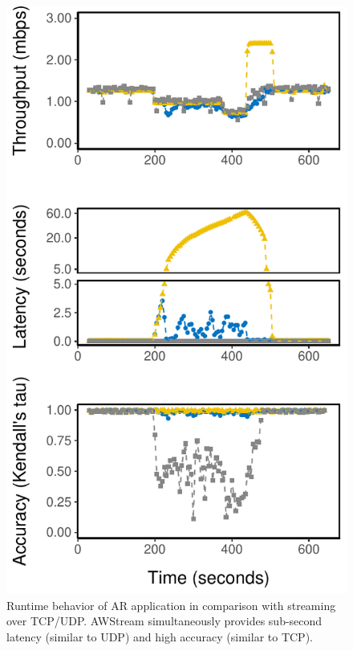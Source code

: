 \begin{figure}
  \centering
  \includegraphics[width=\columnwidth]{figures/runtime-topk-verticle.pdf}
  \caption{Runtime behavior of AR application in comparison with streaming over
    TCP/UDP\@. AWStream simultaneously provides sub-second latency (similar to
    UDP) and high accuracy (similar to TCP).}
  \label{fig:tk-runtime}
\end{figure}

